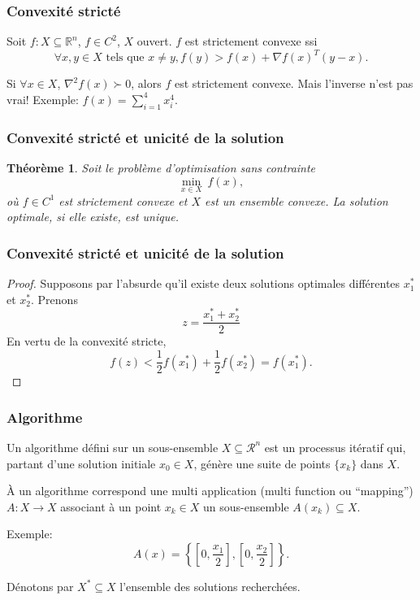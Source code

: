 \documentclass[usepdftitle=false]{beamer}
\newtheorem{thm}{Théorème}
\def\cR{\mathcal{R}}
\def\RR{\mathbb{R}}
\begin{document}
\begin{frame}
\frametitle{Convexité stricté}

Soit $f: X \subseteq \RR^n$, $f \in C^2$, $X$ ouvert. $f$ est strictement convexe ssi
$$
\forall x, y \in X \mbox{ tels que } x \ne y, f(y) > f(x) + \nabla f(x)^T(y-x).
$$

\mbox{}

Si $\forall x \in X$, $\nabla^2 f(x) \succ 0$, alors $f$ est strictement convexe. Mais l'inverse n'est pas vrai! Exemple: $f(x) = \sum_{i=1}^4 x_i^4$.

\end{frame}

\begin{frame}
\frametitle{Convexité stricté et unicité de la solution}

\begin{thm}
Soit le problème d'optimisation sans contrainte
$$\min_{x \in X}\ f(x),$$
où $f \in C^1$ est strictement convexe et $X$ est un ensemble convexe.
La solution optimale, si elle existe, est unique.
\end{thm}

\end{frame}

\begin{frame}
\frametitle{Convexité stricté et unicité de la solution}

\begin{proof}
Supposons par l'absurde qu'il existe deux solutions optimales différentes $x_1^*$ et $x_2^*$. Prenons
$$
z = \frac{x_1^*+x_2^*}{2}
$$
En vertu de la convexité stricte,
$$
f(z) < \frac{1}{2}f(x_1^*) + \frac{1}{2}f(x_2^*) = f(x_1^*).
$$
\end{proof}

\end{frame}

\begin{frame}
\frametitle{Algorithme}

Un algorithme défini sur un sous-ensemble $X \subseteq \cR^n$ est un processus itératif qui, partant d'une solution initiale $x_0 \in X$, génère une suite de points $\{ x_k \}$ dans $X$.

\mbox{}

À un algorithme correspond une multi application (multi function ou ``mapping'') $A: X \rightarrow X$ associant à un point $x_k \in X$ un sous-ensemble $A(x_k) \subseteq X$.

Exemple:
$$
A(x) = \left\{ \left[ 0, \frac{x_1}{2} \right], \left[ 0, \frac{x_2}{2} \right] \right\}.
$$

\mbox{}

Dénotons par $X^* \subseteq X$ l'ensemble des solutions recherchées.

\end{frame}
\end{document}
